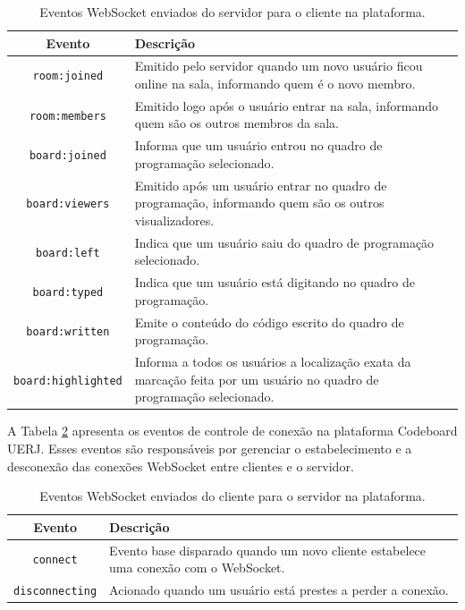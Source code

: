 \begin{table}[H]
    \centering
    \renewcommand{\arraystretch}{1.3} 
    \begin{tabular}{|c|p{10cm}|}
        \hline
        \textbf{Evento} & \textbf{Descrição} \\
        \hline
        \texttt{room:joined} & Emitido pelo servidor quando um novo usuário ficou online na sala, informando quem é o novo membro. \\
        \hline
        \texttt{room:members} & Emitido logo após o usuário entrar na sala, informando quem são os outros membros da sala. \\
        \hline
        \texttt{board:joined} & Informa que um usuário entrou no quadro de programação selecionado. \\
        \hline
        \texttt{board:viewers} & Emitido após um usuário entrar no quadro de programação, informando quem são os outros visualizadores. \\
        \hline
        \texttt{board:left} & Indica que um usuário saiu do quadro de programação selecionado. \\
        \hline
        \texttt{board:typed} & Indica que um usuário está digitando no quadro de programação. \\
        \hline
        \texttt{board:written} & Emite o conteúdo do código escrito do quadro de programação. \\
        \hline
        \texttt{board:highlighted} & Informa a todos os usuários a localização exata da marcação feita por um usuário no quadro de programação selecionado. \\
        \hline
    \end{tabular}
    \caption{Eventos WebSocket enviados do servidor para o cliente na plataforma.}
    \label{tab:websocket-server-to-client-events}
\end{table}

A Tabela \ref{tab:websocket-server-control-events} apresenta os eventos de controle de conexão na plataforma Codeboard UERJ. Esses eventos são responsáveis por gerenciar o estabelecimento e a desconexão das conexões WebSocket entre clientes e o servidor.

\begin{table}[H]
    \centering
    \renewcommand{\arraystretch}{1.3} 
    \begin{tabular}{|c|p{10cm}|}
        \hline
        \textbf{Evento} & \textbf{Descrição} \\
        \hline
        \texttt{connect} & Evento base disparado quando um novo cliente estabelece uma conexão com o WebSocket. \\
        \hline
        \texttt{disconnecting} & Acionado quando um usuário está prestes a perder a conexão. \\
        \hline
    \end{tabular}
    \caption{Eventos WebSocket enviados do cliente para o servidor na plataforma.}
    \label{tab:websocket-server-control-events}
\end{table}


